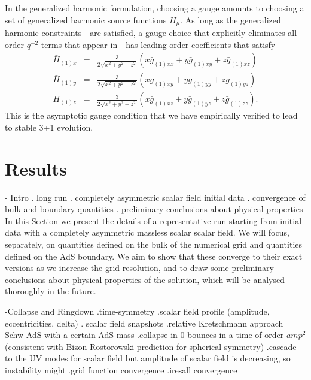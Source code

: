 \documentclass[12pt]{iopart}
\begin{document}
In the generalized harmonic formulation, choosing a gauge amounts to choosing a set of generalized harmonic source functions $H_\mu$. 
As long as the generalized harmonic constraints - are satisfied, a gauge choice that explicitly eliminates all order $q^{-2}$ terms that appear in - has leading order coefficients that satisfy
\begin{eqnarray}\label{eqn:target_gauge}
\bar{H}_{(1)x}&=&\frac{3}{2\sqrt{x^2+y^2+z^2}}(x \bar{g}_{(1)xx}+y\bar{g}_{(1)xy}+z\bar{g}_{(1)xz}) \nonumber \\
\bar{H}_{(1)y}&=&\frac{3}{2\sqrt{x^2+y^2+z^2}}(x \bar{g}_{(1)xy}+y\bar{g}_{(1)yy}+z\bar{g}_{(1)yz}) \nonumber \\
\bar{H}_{(1)z}&=&\frac{3}{2\sqrt{x^2+y^2+z^2}}(x \bar{g}_{(1)xz}+y\bar{g}_{(1)yz}+z\bar{g}_{(1)zz}).
\end{eqnarray}
This is the asymptotic gauge condition that we have empirically verified to lead to stable 3+1 evolution.



\section{Results}\label{sec:results}

- Intro
. long run 
. completely asymmetric scalar field initial data
. convergence of bulk and boundary quantities
. preliminary conclusions about physical properties
In this Section we present the details of a representative run starting from initial data with a completely asymmetric massless scalar scalar field. We will focus, separately, on quantities defined on the bulk of the numerical grid and quantities defined on the AdS boundary. We aim to show that these converge to their exact versions as we increase the grid resolution, and to draw some preliminary conclusions about physical properties of the solution, which will be analysed thoroughly in the future.



-Collapse and Ringdown .time-symmetry .scalar field profile (amplitude, eccentricities, delta) . scalar field snapshots .relative Kretschmann approach Schw-AdS with a certain AdS mass .collapse in 0 bounces in a time of order $amp^2$ (consistent with Bizon-Rostorowski prediction for spherical symmetry) .cascade to the UV modes for scalar field but amplitude of scalar field is decreasing, so instability might .grid function convergence .iresall convergence
\end{document}
